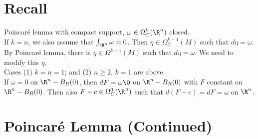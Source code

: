 \documentclass[11pt]{article}
\begin{document}
\section*{Recall}
\label{sec:org78b947a}
Poincaré lemma with compact support, \(\omega\in\Omega^{k}_{C}(\R^{n})\) closed.\\
If \(k=n\), we also assume that \(\int_{\R^{n}}\omega=0\). Then \(\eta\in\Omega^{k-1}_{C}(M)\) such that \(d\eta=\omega\).\\
By Poincaré lemma, there is \(\eta\in\Omega^{k-1}(M)\) such that \(d\eta=\omega\). We need to modify this \(\eta\).\\
Cases (1) \(k=n=1\); and (2) \(n\geq 2\), \(k=1\) are above.\\
If \(\omega=0\) on \(\R^{n}-B_{R}(0)\), then \(dF=\omega\0\) on \(\R^{n}-B_{R}(0)\) with \(F\) constant on \(\R^{n}-B_{R}(0)\). Then also \(F-c\in\Omega^{0}_{C}(\R^{n})\) such that \(d(F-c)=dF=\omega\) on \(\R^{n}\).\\
\section*{Poincaré Lemma (Continued)}
\label{sec:org69ece6f}
\end{document}
